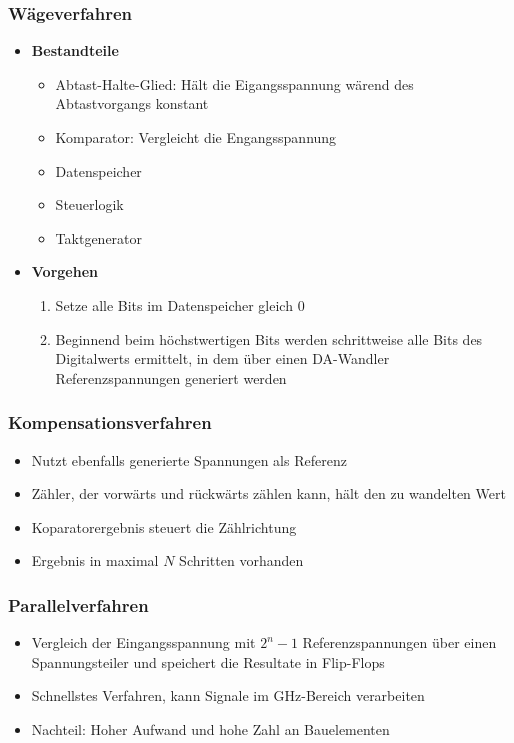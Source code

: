 \subsubsection{Wägeverfahren}
\begin{itemize}
	\item \textbf{Bestandteile}
	\begin{itemize}
		\item Abtast-Halte-Glied: Hält die Eigangsspannung wärend des Abtastvorgangs konstant
		\item Komparator: Vergleicht die Engangsspannung
		\item Datenspeicher
		\item Steuerlogik
		\item Taktgenerator
	\end{itemize}
	\item \textbf{Vorgehen}
	\begin{enumerate}
		\item Setze alle Bits im Datenspeicher gleich $0$
		\item Beginnend beim höchstwertigen Bits werden schrittweise alle Bits des Digitalwerts ermittelt, in dem über einen DA-Wandler Referenzspannungen generiert werden
	\end{enumerate}
\end{itemize}

\subsubsection{Kompensationsverfahren}
\begin{itemize}
	\item Nutzt ebenfalls generierte Spannungen als Referenz
	\item Zähler, der vorwärts und rückwärts zählen kann, hält den zu wandelten Wert
	\item Koparatorergebnis steuert die Zählrichtung
	\item Ergebnis in maximal $N$ Schritten vorhanden
\end{itemize}

\subsubsection{Parallelverfahren}
\begin{itemize}
	\item Vergleich der Eingangsspannung mit $2^n-1$ Referenzspannungen über einen Spannungsteiler und speichert die Resultate in Flip-Flops
	\item Schnellstes Verfahren, kann Signale im GHz-Bereich verarbeiten
	\item Nachteil: Hoher Aufwand und hohe Zahl an Bauelementen
\end{itemize}

